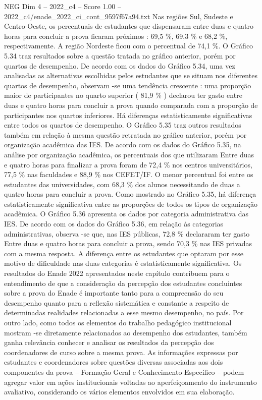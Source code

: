 \begin{textsample}{NEG Dim 4 – 2022\_c4 – Score 1.00 – 2022\_c4/enade\_2022\_ci\_cont\_9597f67a94.txt}
Nas regiões Sul, Sudeste e Centro-Oeste, os percentuais de estudantes que dispensaram entre duas e quatro horas para concluir a prova ficaram próximos : 69,5 \%, 69,3 \% e 68,2 \%, respectivamente.
A região Nordeste ficou com o percentual de 74,1 \%.
O Gráfico 5.34 traz resultados sobre a questão tratada no gráfico anterior, porém por quartos de desempenho.
De acordo com os dados do Gráfico 5.34, uma vez analisadas as alternativas escolhidas pelos estudantes que se situam nos diferentes quartos de desempenho, observam -se uma tendência crescente : uma proporção maior de participantes no quarto superior ( 81,9 \% ) declarou ter gasto entre duas e quatro horas para concluir a prova quando comparada com a proporção de participantes nos quartos inferiores.
Há diferenças estatisticamente significativas entre todos os quartos de desempenho.
O Gráfico 5.35 traz outros resultados também em relação à mesma questão retratada no gráfico anterior, porém por organização acadêmica das IES.
De acordo com os dados do Gráfico 5.35, na análise por organização acadêmica, os percentuais dos que utilizaram Entre duas e quatro horas para finalizar a prova foram de 72,4 \% nos centros universitários, 77,5 \% nas faculdades e 88,9 \% nos CEFET/IF.
O menor percentual foi entre os estudantes das universidades, com 68,3 \% dos alunos necessitando de duas a quatro horas para concluir a prova.
Como mostrado no Gráfico 5.35, há diferença estatisticamente significativa entre as proporções de todos os tipos de organização acadêmica.
O Gráfico 5.36 apresenta os dados por categoria administrativa das IES.
De acordo com os dados do Gráfico 5.36, em relação às categorias administrativas, observa -se que, nas IES públicas, 72,8 \% declararam ter gasto Entre duas e quatro horas para concluir a prova, sendo 70,3 \% nas IES privadas com a mesma resposta.
A diferença entre os estudantes que optaram por esse motivo de dificuldade nas duas categorias é estatisticamente significativa.
Os resultados do Enade 2022 apresentados neste capítulo contribuem para o entendimento de que a consideração da percepção dos estudantes concluintes sobre a prova do Enade é importante tanto para a compreensão do seu desempenho quanto para a reflexão sistemática e constante a respeito de determinadas realidades relacionadas a esse mesmo desempenho, no país.
Por outro lado, como todos os elementos do trabalho pedagógico institucional mostram -se diretamente relacionados ao desempenho dos estudantes, também ganha relevância conhecer e analisar os resultados da percepção dos coordenadores de curso sobre a mesma prova.
As informações expressas por estudantes e coordenadores sobre questões diversas associadas aos dois componentes da prova – Formação Geral e Conhecimento Específico – podem agregar valor em ações institucionais voltadas ao aperfeiçoamento do instrumento avaliativo, considerando os vários elementos envolvidos em sua elaboração.

\end{textsample}
